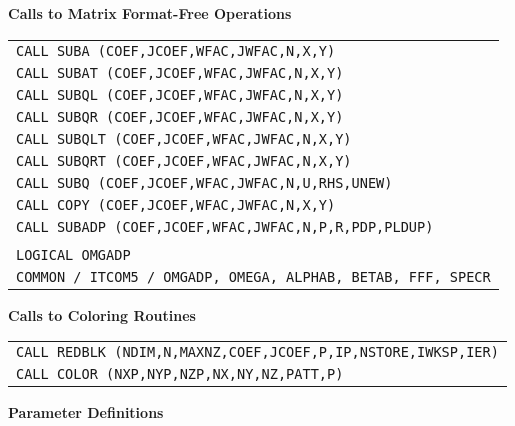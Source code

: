 \bigskip
\noindent
{\bf Calls to Matrix Format-Free Operations}
\bigskip

\begin{tabular}{l}
{\tt   CALL SUBA (COEF,JCOEF,WFAC,JWFAC,N,X,Y)} \\
{\tt   CALL SUBAT (COEF,JCOEF,WFAC,JWFAC,N,X,Y)} \\
{\tt   CALL SUBQL (COEF,JCOEF,WFAC,JWFAC,N,X,Y)} \\
{\tt   CALL SUBQR (COEF,JCOEF,WFAC,JWFAC,N,X,Y)} \\
{\tt   CALL SUBQLT (COEF,JCOEF,WFAC,JWFAC,N,X,Y)} \\
{\tt   CALL SUBQRT (COEF,JCOEF,WFAC,JWFAC,N,X,Y)} \\
{\tt   CALL SUBQ (COEF,JCOEF,WFAC,JWFAC,N,U,RHS,UNEW)} \\
{\tt   CALL COPY (COEF,JCOEF,WFAC,JWFAC,N,X,Y)} \\
{\tt   CALL SUBADP (COEF,JCOEF,WFAC,JWFAC,N,P,R,PDP,PLDUP)} \\
                         \\
{\tt   LOGICAL OMGADP} \\
{\tt   COMMON / ITCOM5 / OMGADP, OMEGA, ALPHAB, BETAB, FFF, SPECR} 
\end{tabular}

\bigskip
\noindent
{\bf Calls to Coloring Routines}
\bigskip

\begin{tabular}{l}
{\tt   CALL REDBLK (NDIM,N,MAXNZ,COEF,JCOEF,P,IP,NSTORE,IWKSP,IER)} \\
{\tt   CALL COLOR (NXP,NYP,NZP,NX,NY,NZ,PATT,P)} 
\end{tabular}

\newpage
\noindent
{\bf Parameter Definitions}
\bigskip

